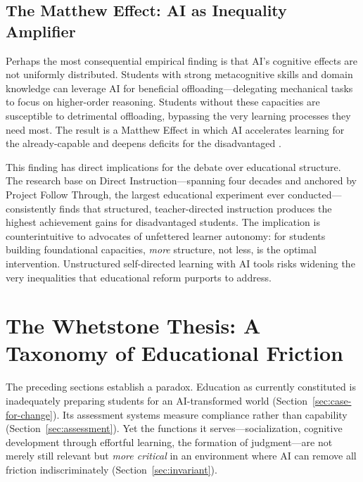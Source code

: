 \documentclass[12pt]{article}
\begin{document}
\subsection{The Matthew Effect: AI as Inequality Amplifier}
\label{sec:matthew}

Perhaps the most consequential empirical finding is that AI's cognitive effects are not uniformly distributed. Students with strong metacognitive skills and domain knowledge can leverage AI for beneficial offloading---delegating mechanical tasks to focus on higher-order reasoning. Students without these capacities are susceptible to detrimental offloading, bypassing the very learning processes they need most. The result is a Matthew Effect in which AI accelerates learning for the already-capable and deepens deficits for the disadvantaged \citep{AIbridgingwidening2025, GenAIequalizer2026}.

This finding has direct implications for the debate over educational structure. The research base on Direct Instruction---spanning four decades and anchored by Project Follow Through, the largest educational experiment ever conducted---consistently finds that structured, teacher-directed instruction produces the highest achievement gains for disadvantaged students. The implication is counterintuitive to advocates of unfettered learner autonomy: for students building foundational capacities, \emph{more} structure, not less, is the optimal intervention. Unstructured self-directed learning with AI tools risks widening the very inequalities that educational reform purports to address.

\section{The Whetstone Thesis: A Taxonomy of Educational Friction}
\label{sec:whetstone}

The preceding sections establish a paradox. Education as currently constituted is inadequately preparing students for an AI-transformed world (Section~\ref{sec:case-for-change}). Its assessment systems measure compliance rather than capability (Section~\ref{sec:assessment}). Yet the functions it serves---socialization, cognitive development through effortful learning, the formation of judgment---are not merely still relevant but \emph{more critical} in an environment where AI can remove all friction indiscriminately (Section~\ref{sec:invariant}).
\end{document}
